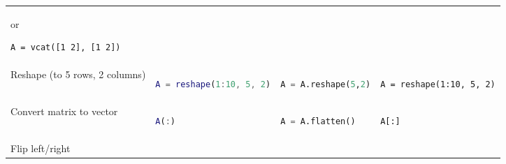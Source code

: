 \documentclass[10pt, landscape]{article}
\begin{document}
\begin{multicols}{2}
\begin{tabular}[]{@{}llll@{}}
\begin{minipage}[t]{0.20\columnwidth}
or

\begin{lstlisting}
A = vcat([1 2], [1 2])
\end{lstlisting}
\strut
\end{minipage}\tabularnewline
\begin{minipage}[t]{0.24\columnwidth}\raggedright\strut
Reshape (to 5 rows, 2 columns)\strut
\end{minipage} & \begin{minipage}[t]{0.23\columnwidth}\raggedright\strut
\begin{lstlisting}[language=Matlab]
A = reshape(1:10, 5, 2)
\end{lstlisting}
\strut
\end{minipage} & \begin{minipage}[t]{0.20\columnwidth}\raggedright\strut
\begin{lstlisting}[language=Python]
A = A.reshape(5,2)
\end{lstlisting}
\strut
\end{minipage} & \begin{minipage}[t]{0.20\columnwidth}\raggedright\strut
\begin{lstlisting}
A = reshape(1:10, 5, 2)
\end{lstlisting}
\strut
\end{minipage}\tabularnewline
\begin{minipage}[t]{0.24\columnwidth}\raggedright\strut
Convert matrix to vector\strut
\end{minipage} & \begin{minipage}[t]{0.23\columnwidth}\raggedright\strut
\begin{lstlisting}[language=Matlab]
A(:)
\end{lstlisting}
\strut
\end{minipage} & \begin{minipage}[t]{0.20\columnwidth}\raggedright\strut
\begin{lstlisting}[language=Python]
A = A.flatten()
\end{lstlisting}
\strut
\end{minipage} & \begin{minipage}[t]{0.20\columnwidth}\raggedright\strut
\begin{lstlisting}
A[:]
\end{lstlisting}
\strut
\end{minipage}\tabularnewline
\begin{minipage}[t]{0.24\columnwidth}\raggedright\strut
Flip left/right\strut
\end{minipage} & \begin{minipage}[t]{0.23\columnwidth}\raggedright\strut

\end{minipage}
\end{tabular}
\end{multicols}
\end{document}
